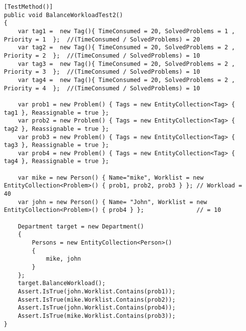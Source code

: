\begin{lstlisting}[style=sourceCode, caption=\myCaption{An example unit test which tests a specific instance of the balanceWorkload method.}, label=lst:balanceWorkloadTest19]
[TestMethod()]
public void BalanceWorkloadTest2()
{
    var tag1 =  new Tag(){ TimeConsumed = 20, SolvedProblems = 1 , Priority = 1  };  //(TimeConsumed / SolvedProblems) = 20
    var tag2 =  new Tag(){ TimeConsumed = 20, SolvedProblems = 2 , Priority = 2  };  //(TimeConsumed / SolvedProblems) = 10
    var tag3 =  new Tag(){ TimeConsumed = 20, SolvedProblems = 2 , Priority = 3  };  //(TimeConsumed / SolvedProblems) = 10
    var tag4 =  new Tag(){ TimeConsumed = 20, SolvedProblems = 2 , Priority = 4  };  //(TimeConsumed / SolvedProblems) = 10

    var prob1 = new Problem() { Tags = new EntityCollection<Tag> { tag1 }, Reassignable = true };
    var prob2 = new Problem() { Tags = new EntityCollection<Tag> { tag2 }, Reassignable = true };
    var prob3 = new Problem() { Tags = new EntityCollection<Tag> { tag3 }, Reassignable = true };
    var prob4 = new Problem() { Tags = new EntityCollection<Tag> { tag4 }, Reassignable = true };
   
    var mike = new Person() { Name="mike", Worklist = new EntityCollection<Problem>() { prob1, prob2, prob3 } }; // Workload = 40
    var john = new Person() { Name= "John", Worklist = new EntityCollection<Problem>() { prob4 } };               // = 10

    Department target = new Department()
    {
        Persons = new EntityCollection<Person>()
        {
            mike, john
        }
    };
    target.BalanceWorkload();
    Assert.IsTrue(john.Worklist.Contains(prob1));
    Assert.IsTrue(mike.Worklist.Contains(prob2));
    Assert.IsTrue(john.Worklist.Contains(prob4));
    Assert.IsTrue(mike.Worklist.Contains(prob3));
}
\end{lstlisting}

